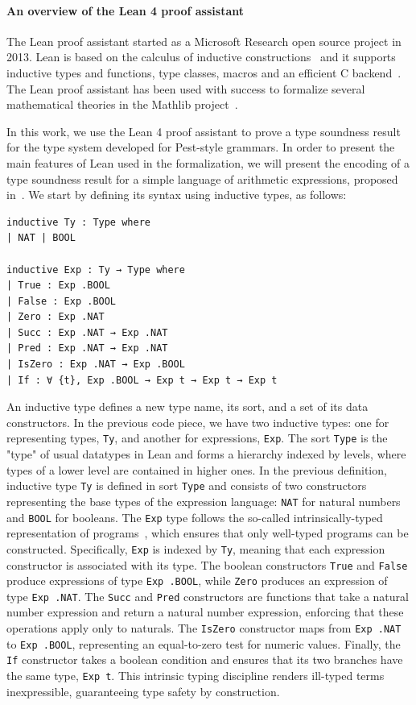 \documentclass[preprint,12pt]{elsarticle}
\theoremstyle{definition}
\begin{document}
\paragraph{An overview of the Lean 4 proof assistant}
The Lean proof assistant started as a Microsoft Research
open source project in 2013. Lean is based on the
calculus of inductive constructions~\cite{Nederpelt14} and it supports
inductive types and functions, type classes, macros and an efficient
C backend~\cite{demoura2021}. The Lean proof assistant has been used
with success to formalize several mathematical theories in the
Mathlib project~\cite{Mathlib}.

In this work, we use the Lean 4 proof assistant to prove a
type soundness result for the type system developed for
Pest-style grammars. In order to present the main features
of Lean used in the formalization, we will present the
encoding of a type soundness result for a simple language of
arithmetic expressions, proposed in~\cite{Pierce02}. We
start by defining its syntax using inductive types, as follows:

\begin{lstlisting}
inductive Ty : Type where
| NAT | BOOL

inductive Exp : Ty → Type where
| True : Exp .BOOL
| False : Exp .BOOL
| Zero : Exp .NAT
| Succ : Exp .NAT → Exp .NAT
| Pred : Exp .NAT → Exp .NAT
| IsZero : Exp .NAT → Exp .BOOL
| If : ∀ {t}, Exp .BOOL → Exp t → Exp t → Exp t
\end{lstlisting}

An inductive type defines a new type name, its sort,
and a set of its data constructors. In the previous code
piece, we have two inductive types: one for representing
types, \lstinline|Ty|, and another for expressions, \lstinline|Exp|.
The sort \lstinline|Type| is the "type" of usual datatypes in Lean
and forms a hierarchy indexed by levels, where types of a lower level
are contained in higher ones. In the previous definition, inductive type
\lstinline|Ty| is defined in sort \lstinline|Type| and consists of two
constructors representing the base types of the expression language:
\lstinline|NAT| for natural numbers and \lstinline|BOOL| for booleans.
The \lstinline|Exp| type follows the so-called intrinsically-typed
representation of programs~\cite{Poulsen17,Feitosa22}, which ensures that only
well-typed programs can be constructed. Specifically, \lstinline|Exp| is
indexed by \lstinline|Ty|, meaning that each expression constructor is
associated with its type. The boolean constructors \lstinline|True| and
\lstinline|False| produce expressions of type \lstinline|Exp .BOOL|,
while \lstinline|Zero| produces an expression of type \lstinline|Exp .NAT|.
The \lstinline|Succ| and \lstinline|Pred| constructors are functions that
take a natural number expression and return a natural number expression,
enforcing that these operations apply only to naturals. The
\lstinline|IsZero| constructor maps from \lstinline|Exp .NAT| to
\lstinline|Exp .BOOL|, representing an equal-to-zero test for numeric values.
Finally, the \lstinline|If| constructor takes a boolean condition and ensures that
its two branches have the same type, \lstinline|Exp t|. This intrinsic typing
discipline renders ill-typed terms inexpressible, guaranteeing type safety by
construction.
\end{document}
